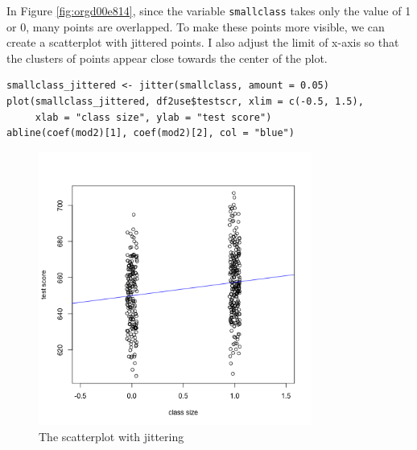 \documentclass[11pt]{article}
\begin{document}
In Figure \ref{fig:orgd00e814}, since the variable \texttt{smallclass} takes only
the value of 1 or 0, many points are overlapped. To make these points
more visible, we can create a scatterplot with jittered points. I also
adjust the limit of x-axis so that the clusters of points appear close
towards the center of the plot.

\begin{verbatim}
smallclass_jittered <- jitter(smallclass, amount = 0.05)
plot(smallclass_jittered, df2use$testscr, xlim = c(-0.5, 1.5),
     xlab = "class size", ylab = "test score")
abline(coef(mod2)[1], coef(mod2)[2], col = "blue")
\end{verbatim}

\begin{figure}[htbp]
\centering
\includegraphics[width=0.8\textwidth]{jittered_scatter_smallclass.png}
\caption{\label{fig:orgf47fd2e}
The scatterplot with jittering}
\end{figure}
\end{document}
